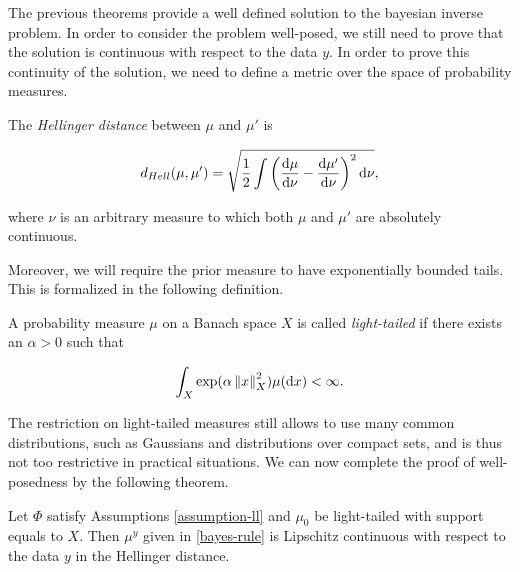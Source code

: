 The previous theorems provide a well defined solution to the bayesian inverse problem. In order to consider the problem well-posed, we still need to prove that the solution is continuous with respect to the data $y$. In order to prove this continuity of the solution, we need to define a metric over the space of probability measures.

\begin{definition} The \textit{Hellinger distance} between $\mu$ and $\mu'$ is

  \begin{equation*}
    d_{Hell}(\mu, \mu') = \sqrt{\frac12\int\left(\frac{\text{d} \mu}{\text{d} \nu} - \frac{\text{d} \mu'}{\text{d} \nu}\right)^2\text{d} \nu},
  \end{equation*}

  where $\nu$ is an arbitrary measure to which both $\mu$ and $\mu'$ are absolutely continuous.
\end{definition}

Moreover, we will require the prior measure to have exponentially bounded tails. This is formalized in the following definition.

\begin{definition}
  A probability measure $\mu$ on a Banach space $X$ is called \textit{light-tailed} if there exists an $\alpha > 0$ such that

  \begin{equation*}
    \int_X\exp(\alpha\left\lVert x\right\rVert^2_X)\mu(\text{d} x) < \infty.
  \end{equation*}
\end{definition}

The restriction on light-tailed measures still allows to use many common distributions, such as Gaussians and distributions over compact sets, and is thus not too restrictive in practical situations. We can now complete the proof of well-posedness by the following theorem.

\begin{theorem}
  Let $\Phi$ satisfy Assumptions \ref{assumption-ll} and $\mu_0$ be light-tailed with support equals to $X$. Then $\mu^y$ given in \ref{bayes-rule} is Lipschitz continuous with respect to the data $y$ in the Hellinger distance.
\end{theorem}

